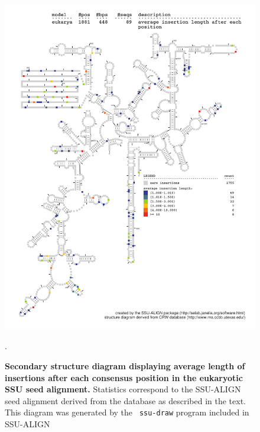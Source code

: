 \begin{figure}
\begin{center}
\includegraphics[width=5.64in]{Figures/eukarya-0p1-iavglen}
\end{center}
\caption[Secondary structure diagram displaying average length of insertions
  after each consensus position in the eukaryotic SSU seed
  alignment]{\textbf{Secondary structure diagram displaying average
    length of insertions after each consensus position in the eukaryotic SSU seed
  alignment.} Statistics correspond to the SSU-ALIGN seed
  alignment derived from the  database \cite{CannoneGutell02}
  as described in the text. This diagram was generated by the {\tt
  ssu-draw} program included in SSU-ALIGN}.
\label{fig:eukiavglen}
\end{figure}

